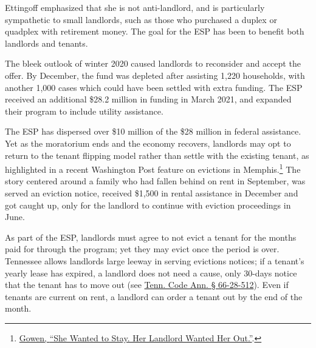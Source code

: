 \documentclass[
  openany]{book}
\begin{document}
Ettingoff emphasized that she is not anti-landlord, and is particularly sympathetic to small landlords, such as those who purchased a duplex or quadplex with retirement money. The goal for the ESP has been to benefit both landlords and tenants.

The bleek outlook of winter 2020 caused landlords to reconsider and accept the offer. By December, the fund was depleted after assisting 1,220 households, with another 1,000 cases which could have been settled with extra funding. The ESP received an additional \$28.2 million in funding in March 2021, and expanded their program to include utility assistance.

The ESP has dispersed over \$10 million of the \$28 million in federal assistance. Yet as the moratorium ends and the economy recovers, landlords may opt to return to the tenant flipping model rather than settle with the existing tenant, as highlighted in a recent Washington Post feature on evictions in Memphis.\footnote{\protect\hyperlink{ref-gowen2021}{Gowen, {``She Wanted to Stay. Her Landlord Wanted Her Out.''}}.} The story centered around a family who had fallen behind on rent in September, was served an eviction notice, received \$1,500 in rental assistance in December and got caught up, only for the landlord to continue with eviction proceedings in June.

As part of the ESP, landlords must agree to not evict a tenant for the months paid for through the program; yet they may evict once the period is over. Tennessee allows landlords large leeway in serving evictions notices; if a tenant's yearly lease has expired, a landlord does not need a cause, only 30-days notice that the tenant has to move out (see \href{http://law.justia.com/codes/tennessee/2010/title-66/chapter-28/part-5/66-28-512}{Tenn. Code Ann. § 66-28-512}). Even if tenants are current on rent, a landlord can order a tenant out by the end of the month.
\end{document}
